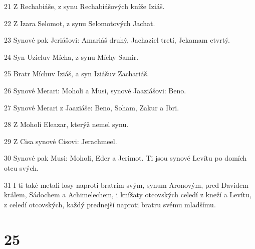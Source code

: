 \par 21 Z Rechabiáše, z synu Rechabiášových kníže Iziáš.
\par 22 Z Izara Selomot, z synu Selomotových Jachat.
\par 23 Synové pak Jeriášovi: Amariáš druhý, Jachaziel tretí, Jekamam ctvrtý.
\par 24 Syn Uzieluv Mícha, z synu Míchy Samir.
\par 25 Bratr Míchuv Iziáš, a syn Iziášuv Zachariáš.
\par 26 Synové Merari: Moholi a Musi, synové Jaaziášovi: Beno.
\par 27 Synové Merari z Jaaziáše: Beno, Soham, Zakur a Ibri.
\par 28 Z Moholi Eleazar, kterýž nemel synu.
\par 29 Z Cisa synové Cisovi: Jerachmeel.
\par 30 Synové pak Musi: Moholi, Eder a Jerimot. Ti jsou synové Levítu po domích otcu svých.
\par 31 I ti také metali losy naproti bratrím svým, synum Aronovým, pred Davidem králem, Sádochem a Achimelechem, i knížaty otcovských celedí z kneží a Levítu, z celedí otcovských, každý prednejší naproti bratru svému mladšímu.

\chapter{25}

